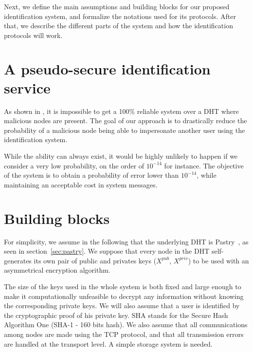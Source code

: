 Next, we define the main assumptions and building blocks for our proposed
identification system, and formalize the notations used for its protocols.
After that, we describe the different parts of the system and how the
identification protocols will work.


\section{A pseudo-secure identification service}
\label{sec:pseudo-secure}
As shown in \cite{the_sybil_attack}, it is impossible to get a 100\% reliable
system over a DHT where malicious nodes are present. The goal of our approach
is to drastically reduce the probability of a malicious node being able to impersonate
another user using the identification system.

While the ability can always exist, it would be highly unlikely to happen
if we consider a very low probability, on the order of $10^{-14}$ for instance. The objective of 
the system is to obtain a probability of error lower than $10^{-14}$, while
maintaining an acceptable cost in system messages.

\section{Building blocks}
\label{sec:building_blocks}

For simplicity, we assume in the following that the underlying DHT is
Pastry~\cite{pastry}, as seen in section~\ref{sec:pastry}. We suppose that
every node in the DHT self-generates its own pair of public and privates keys
($X^{pub}$, $X^{priv}$) to be used with an asymmetrical encryption
algorithm.%

 The size of the keys used in the whole system is both fixed and large enough to make it computationally
unfeasible to decrypt any information without knowing the corresponding private
keys. We will also assume that a user is identified by the cryptographic proof of
his private key. SHA stands for the Secure Hash Algorithm One (SHA-1 - 160 bits hash). We also
assume that all communications among nodes are made using the TCP protocol, and
that all transmission errors are handled at the transport level.
A simple storage system is needed.


